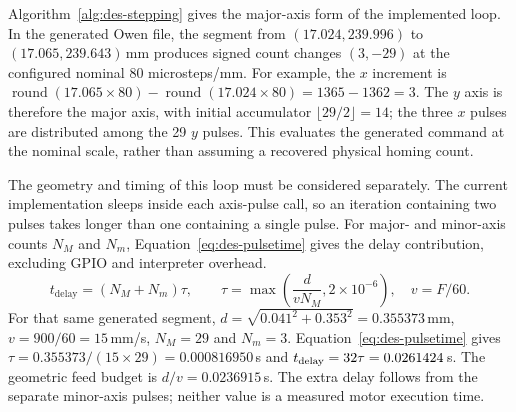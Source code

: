 Algorithm~\ref{alg:des-stepping} gives the major-axis form of the implemented loop. In the generated Owen file, the segment from $(17.024,239.996)$ to $(17.065,239.643)$\,mm produces signed count changes $(3,-29)$ at the configured nominal 80 microsteps/mm. For example, the $x$ increment is $\operatorname{round}(17.065\times80)-\operatorname{round}(17.024\times80)=1365-1362=3$. The $y$ axis is therefore the major axis, with initial accumulator $\lfloor29/2\rfloor=14$; the three $x$ pulses are distributed among the 29 $y$ pulses. This evaluates the generated command at the nominal scale, rather than assuming a recovered physical homing count.


\begin{designalgorithm}
\caption{Coordinated axis stepping with interruption checks}
\label{alg:des-stepping}
\begin{designpseudo}
\end{designpseudo}
\end{designalgorithm}

The geometry and timing of this loop must be considered separately. The current implementation sleeps inside each axis-pulse call, so an iteration containing two pulses takes longer than one containing a single pulse. For major- and minor-axis counts $N_M$ and $N_m$, Equation~\ref{eq:des-pulsetime} gives the delay contribution, excluding GPIO and interpreter overhead.
\begin{equation}
t_{\mathrm{delay}}=(N_M+N_m)\tau,\qquad
\tau=\max\left(\frac{d}{vN_M},2\times10^{-6}\right),\quad v=F/60.
\label{eq:des-pulsetime}
\end{equation}
For that same generated segment, $d=\sqrt{0.041^2+0.353^2}=0.355373$\,mm, $v=900/60=15$\,mm/s, $N_M=29$ and $N_m=3$. Equation~\ref{eq:des-pulsetime} gives $\tau=0.355373/(15\times29)=0.000816950$\,s and $t_{\rm delay}=32\tau=0.0261424$\,s. The geometric feed budget is $d/v=0.0236915$\,s. The extra delay follows from the separate minor-axis pulses; neither value is a measured motor execution time.

